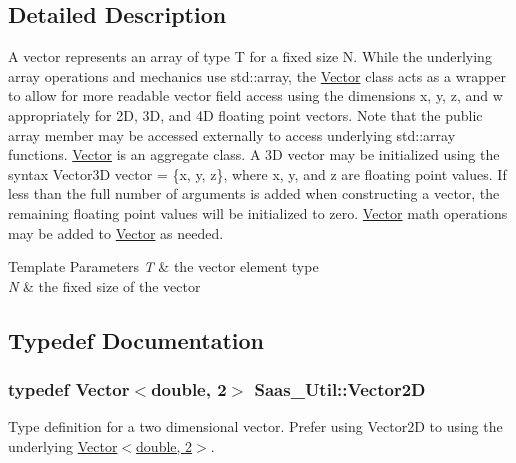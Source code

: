 \subsection{Detailed Description}
A vector represents an array of type T for a fixed size N. While the underlying array operations and mechanics use std\+::array, the \hyperlink{class_saas___util_1_1_vector}{Vector} class acts as a wrapper to allow for more readable vector field access using the dimensions x, y, z, and w appropriately for 2\+D, 3\+D, and 4\+D floating point vectors. Note that the public array member may be accessed externally to access underlying std\+::array functions. \hyperlink{class_saas___util_1_1_vector}{Vector} is an aggregate class. A 3\+D vector may be initialized using the syntax Vector3\+D vector = \{x, y, z\}, where x, y, and z are floating point values. If less than the full number of arguments is added when constructing a vector, the remaining floating point values will be initialized to zero. \hyperlink{class_saas___util_1_1_vector}{Vector} math operations may be added to \hyperlink{class_saas___util_1_1_vector}{Vector} as needed. 
\begin{DoxyTemplParams}{Template Parameters}
{\em T} & the vector element type \\
\hline
{\em N} & the fixed size of the vector \\
\hline
\end{DoxyTemplParams}


\subsection{Typedef Documentation}
\hypertarget{namespace_saas___util_a9142c27b864f179a6b89e082b9ecf031}{}
\subsubsection[{Vector2\+D}]{\setlength{\rightskip}{0pt plus 5cm}typedef {\bf Vector}$<$double, 2$>$ {\bf Saas\+\_\+\+Util\+::\+Vector2\+D}}\label{namespace_saas___util_a9142c27b864f179a6b89e082b9ecf031}
Type definition for a two dimensional vector. Prefer using Vector2\+D to using the underlying \hyperlink{struct_saas___util_1_1_vector_3_01double_00_012_01_4}{Vector$<$double, 2$>$}. \hypertarget{namespace_saas___util_aa7cd6c60d40d077fa462d922096a5234}{}
